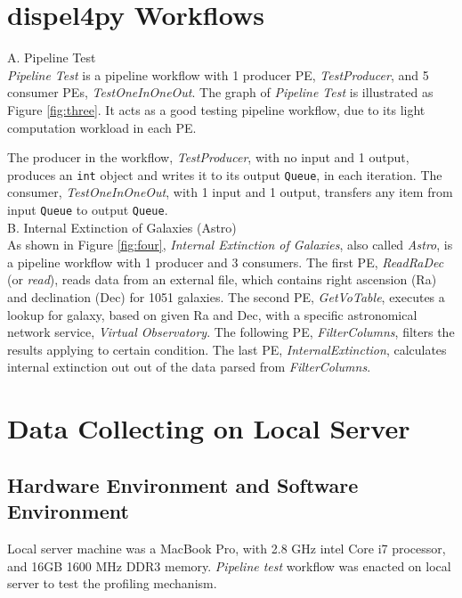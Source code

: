 \documentclass[10pt,twoside,openright,logo]{report}
\begin{document}
\section{dispel4py Workflows}
A. Pipeline Test\\
\textit{Pipeline Test} is a pipeline workflow with 1 producer PE, \textit{TestProducer}, and 5 consumer PEs, \textit{TestOneInOneOut}. The graph of \textit{Pipeline Test} is illustrated as Figure \ref{fig:three}. It acts as a good testing pipeline workflow, due to its light computation workload in each PE.

The producer in the workflow, \textit{TestProducer}, with no input and 1 output, produces an \texttt{int} object and writes it to its output \texttt{Queue}, in each iteration.
The consumer, \textit{TestOneInOneOut}, with 1 input and 1 output, transfers any item from input \texttt{Queue} to output \texttt{Queue}.\\

\noindent
B. Internal Extinction of Galaxies (Astro)\\
As shown in Figure \ref{fig:four}, \textit{Internal Extinction of Galaxies}, also called \textit{Astro}, is a pipeline workflow with 1 producer and 3 consumers.
The first PE, \textit{ReadRaDec} (or \textit{read}), reads data from an external file, which contains right ascension (Ra) and declination (Dec) for 1051 galaxies. The second PE, \textit{GetVoTable}, executes a lookup for galaxy, based on given Ra and Dec, with a specific astronomical network service, \textit{Virtual Observatory}. The following PE, \textit{FilterColumns}, filters the results applying to certain condition. The last PE, \textit{InternalExtinction}, calculates internal extinction out out of the data parsed from \textit{FilterColumns}.\\

\figfour

\section{Data Collecting on Local Server}
\subsection{Hardware Environment and Software Environment}
Local server machine was a MacBook Pro, with 2.8 GHz intel Core i7 processor, and 16GB 1600 MHz DDR3 memory. \textit{Pipeline test} workflow was enacted on local server to test the profiling mechanism.
\end{document}
